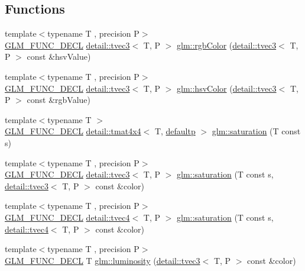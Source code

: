 \subsection*{Functions}
\begin{DoxyCompactItemize}
\item 
{\footnotesize template$<$typename T , precision P$>$ }\\\hyperlink{setup_8hpp_ab2d052de21a70539923e9bcbf6e83a51}{G\+L\+M\+\_\+\+F\+U\+N\+C\+\_\+\+D\+E\+CL} \hyperlink{structglm_1_1detail_1_1tvec3}{detail\+::tvec3}$<$ T, P $>$ \hyperlink{group__gtx__color__space_gafe29cc37c2675aee66c9f9ae3e5e7294}{glm\+::rgb\+Color} (\hyperlink{structglm_1_1detail_1_1tvec3}{detail\+::tvec3}$<$ T, P $>$ const \&hsv\+Value)
\item 
{\footnotesize template$<$typename T , precision P$>$ }\\\hyperlink{setup_8hpp_ab2d052de21a70539923e9bcbf6e83a51}{G\+L\+M\+\_\+\+F\+U\+N\+C\+\_\+\+D\+E\+CL} \hyperlink{structglm_1_1detail_1_1tvec3}{detail\+::tvec3}$<$ T, P $>$ \hyperlink{group__gtx__color__space_ga9d3d99c06af10403d317dec0cb655090}{glm\+::hsv\+Color} (\hyperlink{structglm_1_1detail_1_1tvec3}{detail\+::tvec3}$<$ T, P $>$ const \&rgb\+Value)
\item 
{\footnotesize template$<$typename T $>$ }\\\hyperlink{setup_8hpp_ab2d052de21a70539923e9bcbf6e83a51}{G\+L\+M\+\_\+\+F\+U\+N\+C\+\_\+\+D\+E\+CL} \hyperlink{structglm_1_1detail_1_1tmat4x4}{detail\+::tmat4x4}$<$ T, \hyperlink{namespaceglm_a0f04f086094c747d227af4425893f545a9d21ccd8b5a009ec7eb7677befc3bf51}{defaultp} $>$ \hyperlink{group__gtx__color__space_ga444bcc8582eaa894acf405762ba2a5ff}{glm\+::saturation} (T const s)
\item 
{\footnotesize template$<$typename T , precision P$>$ }\\\hyperlink{setup_8hpp_ab2d052de21a70539923e9bcbf6e83a51}{G\+L\+M\+\_\+\+F\+U\+N\+C\+\_\+\+D\+E\+CL} \hyperlink{structglm_1_1detail_1_1tvec3}{detail\+::tvec3}$<$ T, P $>$ \hyperlink{group__gtx__color__space_ga1a6fe89b5effcc718b5f49de5bb50fad}{glm\+::saturation} (T const s, \hyperlink{structglm_1_1detail_1_1tvec3}{detail\+::tvec3}$<$ T, P $>$ const \&color)
\item 
{\footnotesize template$<$typename T , precision P$>$ }\\\hyperlink{setup_8hpp_ab2d052de21a70539923e9bcbf6e83a51}{G\+L\+M\+\_\+\+F\+U\+N\+C\+\_\+\+D\+E\+CL} \hyperlink{structglm_1_1detail_1_1tvec4}{detail\+::tvec4}$<$ T, P $>$ \hyperlink{group__gtx__color__space_ga42cc34c45ab66e010c629106952c8bdd}{glm\+::saturation} (T const s, \hyperlink{structglm_1_1detail_1_1tvec4}{detail\+::tvec4}$<$ T, P $>$ const \&color)
\item 
{\footnotesize template$<$typename T , precision P$>$ }\\\hyperlink{setup_8hpp_ab2d052de21a70539923e9bcbf6e83a51}{G\+L\+M\+\_\+\+F\+U\+N\+C\+\_\+\+D\+E\+CL} T \hyperlink{group__gtx__color__space_ga3fb6710bbbf4f3e2303b06946e9cf00c}{glm\+::luminosity} (\hyperlink{structglm_1_1detail_1_1tvec3}{detail\+::tvec3}$<$ T, P $>$ const \&color)
\end{DoxyCompactItemize}


